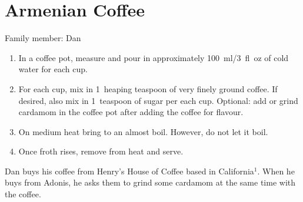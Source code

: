 \chapter{Armenian Coffee}
\label{ch:armeniancoffee}



Family member: Dan

\begin{enumerate}
    \item In a coffee pot, measure and pour in approximately 100~ml/3~fl~oz of cold water for each cup.
    \item For each cup, mix in 1~heaping teaspoon of very finely ground coffee. If desired, also mix in 1~teaspoon of sugar per each cup. Optional: add or grind cardamom in the coffee pot after adding the coffee for flavour.
    \item On medium heat bring to an almost boil. However, do not let it boil.
    \item Once froth rises, remove from heat and serve.
\end{enumerate}

Dan buys his coffee from Henry's House of Coffee based in California$^1$. When he buys from Adonis, he asks them to grind some cardamom at the same time with the coffee.

